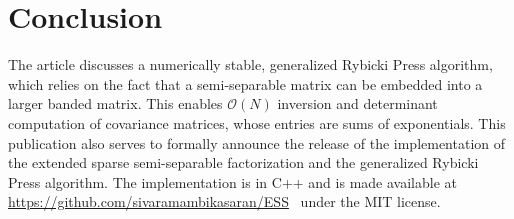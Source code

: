 \documentclass[final,leqno]{siamltex}
\begin{document}
\section{Conclusion}
The article discusses a numerically stable, generalized Rybicki Press algorithm, which relies on the fact that a semi-separable matrix can be embedded into a larger banded matrix. This enables $\mathcal{O}(N)$ inversion and determinant computation of covariance matrices, whose entries are sums of exponentials. This publication also serves to formally announce the release of the implementation of the extended sparse semi-separable factorization and the generalized Rybicki Press algorithm. The implementation is in C++ and is made available at \url{https://github.com/sivaramambikasaran/ESS}~\cite{ambikasaran2014ESS} under the MIT license.

\FloatBarrier

\end{document}
